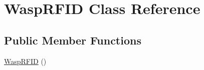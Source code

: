 \hypertarget{class_wasp_r_f_i_d}{}\section{Wasp\+R\+F\+ID Class Reference}
\label{class_wasp_r_f_i_d}
\subsection*{Public Member Functions}
\begin{DoxyCompactItemize}
\item 
\hyperlink{class_wasp_r_f_i_d_a437144d1e8ff2772c0eeca07d57ef29c}{Wasp\+R\+F\+ID} ()\hypertarget{class_wasp_r_f_i_d_a437144d1e8ff2772c0eeca07d57ef29c}{}\label{class_wasp_r_f_i_d_a437144d1e8ff2772c0eeca07d57ef29c}


\end{DoxyCompactItemize}
